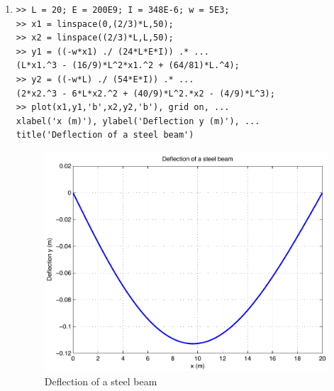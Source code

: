 \begin{enumerate}
\clearpage
\item
\begin{lstlisting}
>> L = 20; E = 200E9; I = 348E-6; w = 5E3;
>> x1 = linspace(0,(2/3)*L,50);
>> x2 = linspace((2/3)*L,L,50);
>> y1 = ((-w*x1) ./ (24*L*E*I)) .* ...
(L*x1.^3 - (16/9)*L^2*x1.^2 + (64/81)*L.^4);
>> y2 = ((-w*L) ./ (54*E*I)) .* ...
(2*x2.^3 - 6*L*x2.^2 + (40/9)*L^2.*x2 - (4/9)*L^3);
>> plot(x1,y1,'b',x2,y2,'b'), grid on, ...
xlabel('x (m)'), ylabel('Deflection y (m)'), ...
title('Deflection of a steel beam')
\end{lstlisting}
\begin{figure}[h]
	\myfloatalign
	\includegraphics[width=\linewidth]{Graphics/Additional-Ex/steel-beam-plot}
	\caption{Deflection of a steel beam}
	\label{fig:steel-beam-plot}
\end{figure}


\end{enumerate}
